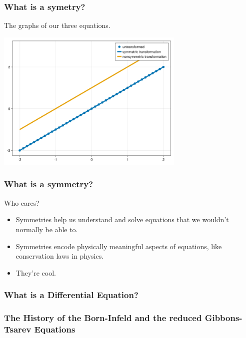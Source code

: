 \documentclass{beamer}
\begin{document}
\begin{frame}
    \frametitle{What is a symetry?}
    The graphs of our three equations.\\
    \begin{center}
        \includegraphics[width=9cm]{y=x+1.png}
    \end{center}
\end{frame}



\begin{frame}
    \frametitle{What is a symmetry?}
    \begin{Large}
        Who cares?
    \end{Large}
    \vspace*{0.25in}
    \begin{itemize}
        \item Symmetries help us understand and solve equations that we wouldn't normally be able to.\pause
        \item Symmetries encode physically meaningful aspects of equations, like conservation laws in physics.\pause
        \item They're cool.
    \end{itemize}
\end{frame}



\begin{frame}
    \frametitle{What is a Differential Equation?}

\end{frame}



\begin{frame}
    \frametitle{The History of the Born-Infeld and the reduced Gibbons-Tsarev Equations}

\end{frame}
\end{document}
